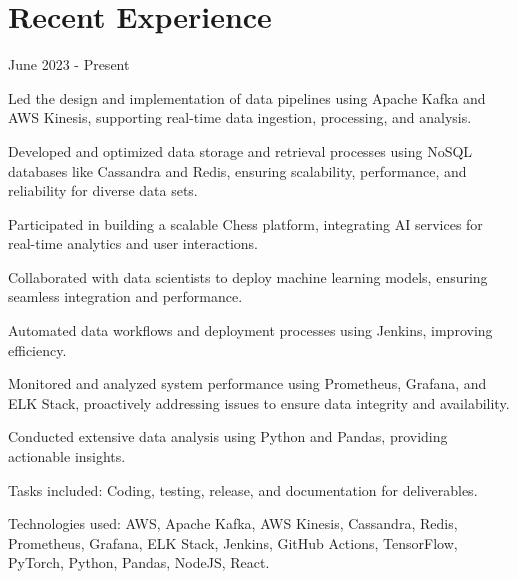 \section{Recent Experience}

 {June 2023 - Present}
\begin{resume_list}
    \item Led the design and implementation of data pipelines using Apache Kafka and AWS Kinesis, supporting real-time data ingestion, processing, and analysis.
    \item Developed and optimized data storage and retrieval processes using NoSQL databases like Cassandra and Redis, ensuring scalability, performance, and reliability for diverse data sets.
    \item Participated in building a scalable Chess platform, integrating AI services for real-time analytics and user interactions.
    \item Collaborated with data scientists to deploy machine learning models, ensuring seamless integration and performance.
    \item Automated data workflows and deployment processes using Jenkins, improving efficiency.
    \item Monitored and analyzed system performance using Prometheus, Grafana, and ELK Stack, proactively addressing issues to ensure data integrity and availability.
    \item Conducted extensive data analysis using Python and Pandas, providing actionable insights.
    \item Tasks included: Coding, testing, release, and documentation for deliverables.
    \item Technologies used: AWS, Apache Kafka, AWS Kinesis, Cassandra, Redis, Prometheus, Grafana, ELK Stack, Jenkins, GitHub Actions, TensorFlow, PyTorch, Python, Pandas, NodeJS, React.
\end{resume_list}

